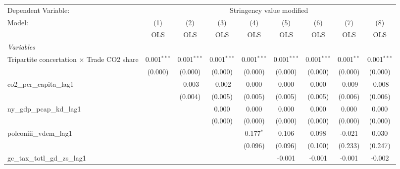 
\begingroup
\centering
\begin{tabular}{lcccccccc}
   \toprule
   Dependent Variable: & \multicolumn{8}{c}{Stringency value modified}\\
   Model:                                            & (1)           & (2)           & (3)           & (4)           & (5)           & (6)           & (7)          & (8)\\  
                                                     &  OLS          & OLS           & OLS           & OLS           & OLS           & OLS           & OLS          & OLS\\  
   \midrule
   \emph{Variables}\\
   Tripartite concertation $\times$ Trade CO2 share  & 0.001$^{***}$ & 0.001$^{***}$ & 0.001$^{***}$ & 0.001$^{***}$ & 0.001$^{***}$ & 0.001$^{***}$ & 0.001$^{**}$ & 0.001$^{***}$\\   
                                                     & (0.000)       & (0.000)       & (0.000)       & (0.000)       & (0.000)       & (0.000)       & (0.000)      & (0.000)\\   
   co2\_per\_capita\_lag1                            &               & -0.003        & -0.002        & 0.000         & 0.000         & 0.000         & -0.009       & -0.008\\   
                                                     &               & (0.004)       & (0.005)       & (0.005)       & (0.005)       & (0.005)       & (0.006)      & (0.006)\\   
   ny\_gdp\_pcap\_kd\_lag1                           &               &               & 0.000         & 0.000         & 0.000         & 0.000         & 0.000        & 0.000\\   
                                                     &               &               & (0.000)       & (0.000)       & (0.000)       & (0.000)       & (0.000)      & (0.000)\\   
   polconiii\_vdem\_lag1                             &               &               &               & 0.177$^{*}$   & 0.106         & 0.098         & -0.021       & 0.030\\   
                                                     &               &               &               & (0.096)       & (0.096)       & (0.100)       & (0.233)      & (0.247)\\   
   gc\_tax\_totl\_gd\_zs\_lag1                       &               &               &               &               & -0.001        & -0.001        & -0.001       & -0.002\\   

\end{tabular}
